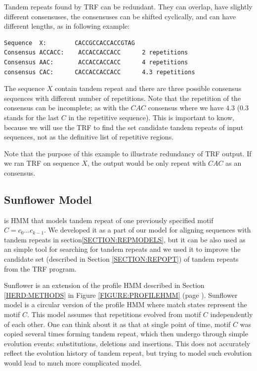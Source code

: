 Tandem repeats found by TRF can be redundant.  They can overlap, have slightly
different consensuses, the consensuses can be shifted cyclically, and can have
different lengths, as in following example:

\begin{verbatim}
Sequence  X:        CACCGCCACCACCGTAG
Consensus ACCACC:    ACCACCACCACC      2 repetitions
Consensus AAC:       ACCACCACCACC      4 repetitions
consensus CAC:      CACCACCACCACC      4.3 repetitions
\end{verbatim}

The sequence $X$ contain tandem repeat and there are three possible consensus
sequences with different number of repetitions. Note that the repetition of the
consensus can be incomplete; as with the $CAC$ consensus where we have $4.3$
($0.3$ stands for the last $C$ in the repetitive sequence). This is important
to know, because we will use the TRF to find the set candidate tandem repeats
of input sequences, not as the definitive list of repetitive regions.

Note that the purpose of this example to illustrate redundancy of TRF output.
If we ran TRF on sequence $X$, the output would be only repeat with $CAC$ as an
consensus.

\subsection{Sunflower Model}\label{SECTION:SUNFLOWERMODEL}
 is HMM that models tandem repeat of one
previously specified motif $C=c_0\dots c_{k-1}$. We developed it as a part of
our model for aligning sequences with tandem repeats in
section\ref{SECTION:REPMODELS}, but it can be also used as an simple tool for
searching for tandem repeats and we used it to improve the candidate set
(described in Section \ref{SECTION:REPOPT}) of tandem repeats from the TRF
program.

Sunflower is an extension of the profile HMM described in Section \ref{HERD:METHODS}
in Figure \ref{FIGURE:PROFILEHMM} (page \pageref{FIGURE:PROFILEHMM}). Sunflower
model is a circular version of the profile HMM where match states represent the
motif $C$. This model assumes that repetitions evolved from motif $C$
independently of each other. One can think about it as that at single point of
time, motif $C$ was copied several times forming tandem repeat, which then
undergo through simple evolution events: substitutions, deletions and
insertions. This does not accurately reflect the evolution history of tandem
repeat, but trying to model such evolution would lead to much more complicated
model.

